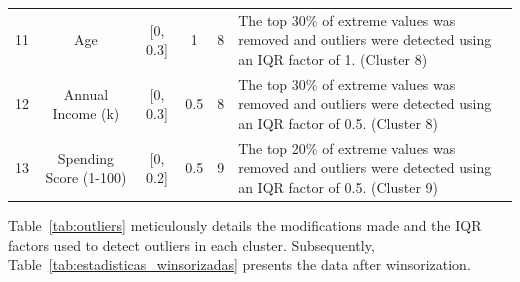 \documentclass[10pt]{article}
\begin{document}
\begin{table}[p]
\begin{tabularx}{\textwidth}{c c c c c X}
    11 & Age                    & [0, 0.3]   & 1   & 8 & The top 30\% of extreme values was removed and outliers were detected using an IQR factor of 1. (Cluster 8) \\
    12 & Annual Income (k)      & [0, 0.3]   & 0.5 & 8 & The top 30\% of extreme values was removed and outliers were detected using an IQR factor of 0.5. (Cluster 8) \\
    13 & Spending Score (1-100) & [0, 0.2]   & 0.5 & 9 & The top 20\% of extreme values was removed and outliers were detected using an IQR factor of 0.5. (Cluster 9) \\
    \bottomrule
    \end{tabularx}
\end{table}

Table~\ref{tab:outliers} meticulously details the modifications made and the IQR factors used to detect outliers in each cluster. Subsequently, Table~\ref{tab:estadisticas_winsorizadas} presents the data after winsorization.
\end{document}
